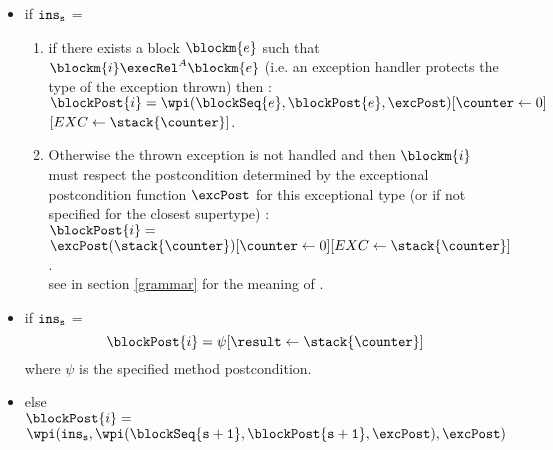 \begin{defn}
\begin{itemize}
\item  if  $\tt{ins}_s$ =   \\ 
	\begin{enumerate}
\item if there exists a block $\blockm{e}$ such that 
$\blockm{i} \execRel^A \blockm{e}$ (i.e. an exception handler protects the type of the exception thrown)
then :\\
$\blockPost{i }= \\ \wpi(\blockSeq{e}, \blockPost{e} ,\excPost)[\counter \leftarrow 0]$\\
\Myspace \Myspace \Myspace  \Myspace  \Myspace  \Myspace  \Myspace  $[EXC \leftarrow \stack{\counter}] $. \\
\item Otherwise the thrown exception is not handled and then $\blockm{i}$ must respect the postcondition determined by
the exceptional postcondition function $\excPost$ for this exceptional type (or if not specified for the closest supertype) : \\ 
 $\blockPost{i }=$\\ $\excPost(\stack{\counter}) [\counter \leftarrow 0][EXC \leftarrow \stack{\counter}] $. \\
see in section \ref{grammar} for the meaning of .
    \end{enumerate}
\item  if  $\tt{ins}_s$ =  \\
$$
   \blockPost{i } = \psi[\result \leftarrow \stack{\counter} ]    
$$
where $\psi $ is the specified method postcondition.
\item  else  \\[3 mm]
 $ \blockPost{i} =$  \\ $\wpi(  \tt{ins}_s , \wpi( \blockSeq{s+1} ,  \blockPost{ s  +1}, \excPost) , \excPost)  $
 \end{itemize}

\end{defn}


